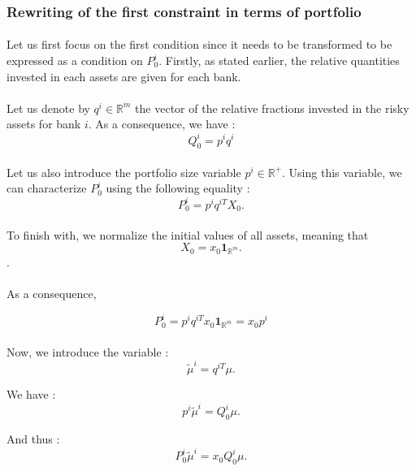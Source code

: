 \documentclass{article}
\begin{document}
\begin{appendices}
\subsubsection{Rewriting of the first constraint in terms of portfolio}

\paragraph{}
Let us first focus on the first condition since it needs to be transformed to be expressed as a condition on $P_0^i$. Firstly, as stated earlier, the relative quantities invested in each assets are given for each bank. 

\paragraph{}
Let us denote by $q^i \in \mathbb{R}^m$ the vector of the relative fractions invested in the risky assets for bank $i$. As a consequence, we have : 
$$Q_0^i = p^i q^i $$

\paragraph{}
Let us also introduce the portfolio size variable $p^i \in \mathbb{R}^+$. Using this variable, we can characterize $P_0^i$ using the following equality :  
$$P_0^i = p^i q^{iT} X_0.$$

\paragraph{}
To finish with, we normalize the initial values of all assets, meaning that 
$$X_0 = x_0 \mathbf{1}_{\mathbb{R}^m}.$$. 

\paragraph{}
As a consequence,

$$P_0^i = p^i q^{iT} x_0 \mathbf{1}_{\mathbb{R}^m} = x_0 p^i$$

\paragraph{}
Now, we introduce the variable : 
$$ \tilde{\mu}^i = q^{iT} \mu.$$

We have : 
$$ p^i \tilde{\mu}^i = Q_0^{i} \mu.$$

And thus : 
$$ P_0^i \tilde{\mu}^i = x_0 Q_0^{i} \mu.$$


\end{appendices}
\end{document}
